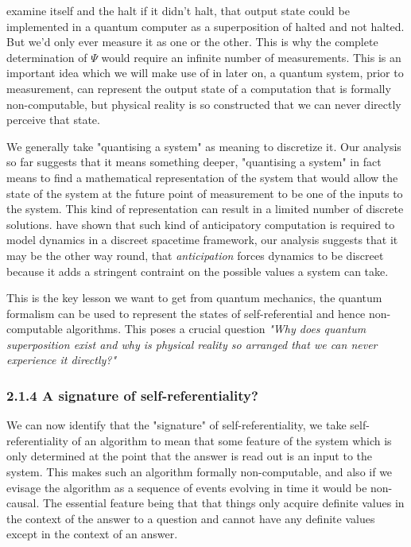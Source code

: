\documentclass[
   ,final            %
  ]
  {aipproc}
\begin{document}
examine itself and the halt if it didn't halt, that output state could be implemented in a quantum computer
as a superposition of halted and not halted. But we'd only ever measure it as one or the other. This is why
the complete determination of $\Psi$ would require an infinite number of measurements. This is an important
idea which we will make use of in later on, a quantum system, prior to measurement, can represent the output
state of a computation that is formally non-computable, but physical reality is so constructed that we can
never directly perceive that state. 
\par
We generally take "quantising a system" as meaning to discretize it. Our analysis so far suggests that it means something deeper, "quantising a %
system" in fact means to find a mathematical representation of the system that would allow the state of the system at the future point of measurement %
to be one of the inputs to the system. This kind of representation can result in a limited number of discrete solutions. \citet*{Antippa_dubois_2004} %
have shown that such kind of anticipatory computation is required to model dynamics in a discreet spacetime framework, our analysis suggests that it %
may be the other way round, that \emph{anticipation} forces dynamics to be discreet because it adds a stringent contraint on the possible values a %
system can take. 
\par
This is the key lesson we want to get from quantum mechanics, the quantum formalism can be used to represent the states of self-referential and hence %
non-computable algorithms. This poses a crucial question \emph{"Why does quantum superposition exist and why is physical reality so arranged that we
can never experience it directly?"}
\subsubsection{2.1.4 A signature of self-referentiality?}
We can now identify that the "signature" of self-referentiality, we take self-referentiality of an algorithm to mean that some feature of the system %
which is only determined at the point that the answer is read out is an input to the system. This makes such an algorithm formally non-computable,  %
and also if we evisage the algorithm as a sequence of events evolving in time it would be non-causal. The essential feature being that that things %
only acquire definite values in the context of the answer to a question and cannot have any definite
values except in the context of an answer. 
\end{document}
